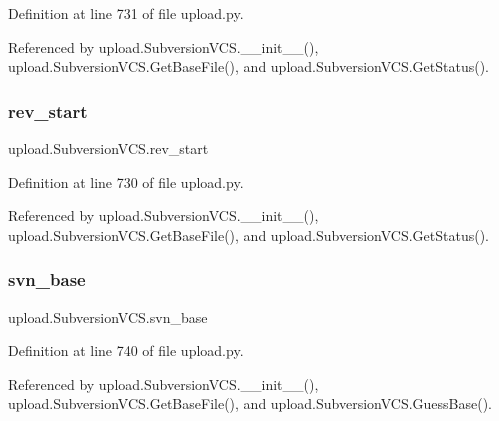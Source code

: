 Definition at line 731 of file upload.\+py.



Referenced by upload.\+Subversion\+V\+C\+S.\+\_\+\+\_\+init\+\_\+\+\_\+(), upload.\+Subversion\+V\+C\+S.\+Get\+Base\+File(), and upload.\+Subversion\+V\+C\+S.\+Get\+Status().

\mbox{\label{classupload_1_1SubversionVCS_ad1553a69f4a790309273dbdeb9077732}} 
\subsubsection{\texorpdfstring{rev\+\_\+start}{rev\_start}}
{\footnotesize\ttfamily upload.\+Subversion\+V\+C\+S.\+rev\+\_\+start}



Definition at line 730 of file upload.\+py.



Referenced by upload.\+Subversion\+V\+C\+S.\+\_\+\+\_\+init\+\_\+\+\_\+(), upload.\+Subversion\+V\+C\+S.\+Get\+Base\+File(), and upload.\+Subversion\+V\+C\+S.\+Get\+Status().

\mbox{\label{classupload_1_1SubversionVCS_a60645c40d2fea4cd52881576bd13341f}} 
\subsubsection{\texorpdfstring{svn\+\_\+base}{svn\_base}}
{\footnotesize\ttfamily upload.\+Subversion\+V\+C\+S.\+svn\+\_\+base}



Definition at line 740 of file upload.\+py.



Referenced by upload.\+Subversion\+V\+C\+S.\+\_\+\+\_\+init\+\_\+\+\_\+(), upload.\+Subversion\+V\+C\+S.\+Get\+Base\+File(), and upload.\+Subversion\+V\+C\+S.\+Guess\+Base().

\mbox{\label{classupload_1_1SubversionVCS_aa801782f807674b06f491df5d7ca9942}} 
